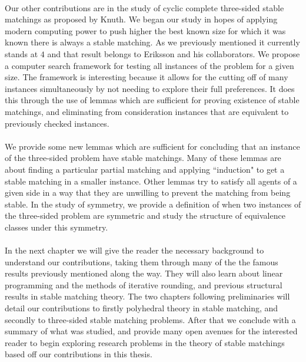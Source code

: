 \paragraph{}
Our other contributions are in the study of cyclic complete three-sided stable matchings as proposed by Knuth. We began our study in hopes of applying modern computing power to push higher the best known size for which it was known there is always a stable matching. As we previously mentioned it currently stands at $4$ and that result belongs to Eriksson and his collaborators. We propose a computer search framework for testing all instances of the problem for a given size. The framework is interesting because it allows for the cutting off of many instances simultaneously by not needing to explore their full preferences. It does this through the use of lemmas which are sufficient for proving existence of stable matchings, and eliminating from consideration instances that are equivalent to previously checked instances. 
\paragraph{}
We provide some new lemmas which are sufficient for concluding that an instance of the three-sided problem have stable matchings. Many of these lemmas are about finding a particular partial matching and applying ``induction" to get a stable matching in a smaller instance. Other lemmas try to satisfy all agents of a given side in a way that they are unwilling to prevent the matching from being stable. In the study of symmetry, we provide a definition of when two instances of the three-sided problem are symmetric and study the structure of equivalence classes under this symmetry.
\paragraph{}
In the next chapter we will give the reader the necessary background to understand our contributions, taking them through many of the the famous results previously mentioned along the way. They will also learn about linear programming and the methods of iterative rounding, and previous structural results in stable matching theory. The two chapters following preliminaries will detail our contributions to firstly polyhedral theory in stable matching, and secondly to three-sided stable matching problems. After that we conclude with a summary of what was studied, and provide many open avenues for the interested reader to begin exploring research problems in the theory of stable matchings based off our contributions in this thesis.
